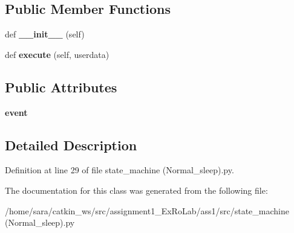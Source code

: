 \subsection*{Public Member Functions}
\begin{DoxyCompactItemize}
\item 
\mbox{\label{classstate__machine_07Normal__sleep_08_1_1Normal_a1886155029a04f82ce9a95d3fcef3b88}} 
def {\bfseries \+\_\+\+\_\+init\+\_\+\+\_\+} (self)
\item 
\mbox{\label{classstate__machine_07Normal__sleep_08_1_1Normal_acee86771b7caec010a3b9e82d95a16ed}} 
def {\bfseries execute} (self, userdata)
\end{DoxyCompactItemize}
\subsection*{Public Attributes}
\begin{DoxyCompactItemize}
\item 
\mbox{\label{classstate__machine_07Normal__sleep_08_1_1Normal_adc5486aab45f372a8b1170aef9e1c416}} 
{\bfseries event}
\end{DoxyCompactItemize}


\subsection{Detailed Description}


Definition at line 29 of file state\+\_\+machine (\+Normal\+\_\+sleep).\+py.



The documentation for this class was generated from the following file\+:\begin{DoxyCompactItemize}
\item 
/home/sara/catkin\+\_\+ws/src/assignment1\+\_\+\+Ex\+Ro\+Lab/ass1/src/state\+\_\+machine (\+Normal\+\_\+sleep).\+py\end{DoxyCompactItemize}
